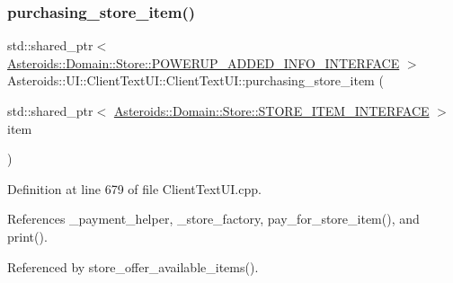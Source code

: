 \subsubsection{\texorpdfstring{purchasing\+\_\+store\+\_\+item()}{purchasing\_store\_item()}}
{\footnotesize\ttfamily std\+::shared\+\_\+ptr$<$ \hyperlink{classAsteroids_1_1Domain_1_1Store_1_1POWERUP__ADDED__INFO__INTERFACE}{Asteroids\+::\+Domain\+::\+Store\+::\+P\+O\+W\+E\+R\+U\+P\+\_\+\+A\+D\+D\+E\+D\+\_\+\+I\+N\+F\+O\+\_\+\+I\+N\+T\+E\+R\+F\+A\+CE} $>$ Asteroids\+::\+U\+I\+::\+Client\+Text\+U\+I\+::\+Client\+Text\+U\+I\+::purchasing\+\_\+store\+\_\+item (\begin{DoxyParamCaption}\item[{std\+::shared\+\_\+ptr$<$ \hyperlink{classAsteroids_1_1Domain_1_1Store_1_1STORE__ITEM__INTERFACE}{Asteroids\+::\+Domain\+::\+Store\+::\+S\+T\+O\+R\+E\+\_\+\+I\+T\+E\+M\+\_\+\+I\+N\+T\+E\+R\+F\+A\+CE} $>$}]{item }\end{DoxyParamCaption})\hspace{0.3cm}{\ttfamily [private]}}



Definition at line 679 of file Client\+Text\+U\+I.\+cpp.



References \+\_\+payment\+\_\+helper, \+\_\+store\+\_\+factory, pay\+\_\+for\+\_\+store\+\_\+item(), and print().



Referenced by store\+\_\+offer\+\_\+available\+\_\+items().

